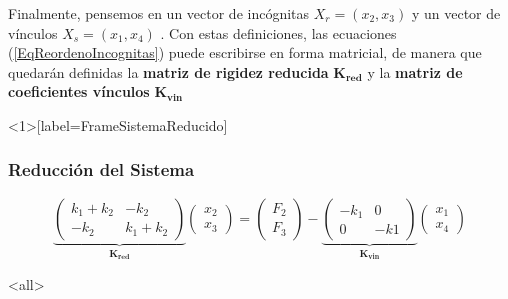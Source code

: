 
Finalmente, pensemos en un vector de incógnitas $X_r = (x_2, x_3)$   y un
vector de vínculos $X_s  = (x_1, x_4)$ . Con estas definiciones, las
ecuaciones (\ref{EqReordenoIncognitas})  puede escribirse en forma matricial, de manera que
  quedarán definidas la \textbf{matriz de rigidez reducida} $\mathbf{K_{red} }$ 
  y la \textbf{matriz de coeficientes vínculos} $\mathbf{K_{vin}}$

\mode*

  \begin{frame}<1>[label=FrameSistemaReducido]
    \frametitle<presentation>{Reducción del Sistema}
    \begin{equation}\label{EqSistemaReducido}
      \underbrace{
	\begin{pmatrix} k_1 + k_2 & - k_2 \\ -k_2 & k_1 + k_2 \end{pmatrix}
	}_{ \mathbf{K_{red} } }
	\begin{pmatrix}x_2 \\ x_3\end{pmatrix}
	  = 
	  \begin{pmatrix}F_2 \\ F_3\end{pmatrix}
	    -
	  \underbrace{
	      \begin{pmatrix} -k_1 & 0 \\ 0 & -k1 \end{pmatrix}
	   }_{ \mathbf{ K_{vin} } }
	\begin{pmatrix}x_1 \\ x_4\end{pmatrix}
    \end{equation}

  \end{frame}


\mode<all>
